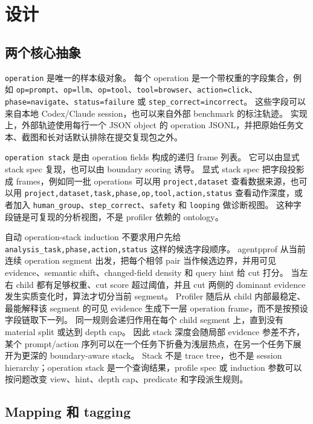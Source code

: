 \documentclass[10pt,twocolumn]{ctexart}
\newcommand{\toolname}{agentpprof}
\newcommand{\op}{\texttt{operation}}
\newcommand{\opstack}{\texttt{operation stack}}
\begin{document}
\section{设计}

\subsection{两个核心抽象}

\op{} 是唯一的样本级对象。
每个 operation 是一个带权重的字段集合，例如 \texttt{op=prompt}、\texttt{op=llm}、\texttt{op=tool}、\texttt{tool=browser}、\texttt{action=click}、\texttt{phase=navigate}、\texttt{status=failure} 或 \texttt{step\_correct=incorrect}。
这些字段可以来自本地 Codex/Claude session，也可以来自外部 benchmark 的标注轨迹。
实现上，外部轨迹使用每行一个 JSON object 的 operation JSONL，并把原始任务文本、截图和长对话默认排除在提交复现包之外。

\opstack{} 是由 operation fields 构成的递归 frame 列表。
它可以由显式 stack spec 复现，也可以由 boundary scoring 诱导。
显式 stack spec 把字段投影成 frames，例如同一批 operations 可以用 \texttt{project,dataset} 查看数据来源，也可以用 \texttt{project,dataset,task,phase,op,tool,action,status} 查看动作深度，或者加入 \texttt{human\_group}、\texttt{step\_correct}、\texttt{safety} 和 \texttt{looping} 做诊断视图。
这种字段链是可复现的分析视图，不是 profiler 依赖的 ontology。

自动 operation-stack induction 不要求用户先给 \texttt{analysis\_task,phase,action,status} 这样的候选字段顺序。
\toolname{} 从当前连续 operation segment 出发，把每个相邻 pair 当作候选边界，并用可见 evidence、semantic shift、changed-field density 和 query hint 给 cut 打分。
当左右 child 都有足够权重、cut score 超过阈值，并且 cut 两侧的 dominant evidence 发生实质变化时，算法才切分当前 segment。
Profiler 随后从 child 内部最稳定、最能解释该 segment 的可见 evidence 生成下一层 operation frame，而不是按预设字段链取下一列。
同一规则会递归作用在每个 child segment 上，直到没有 material split 或达到 depth cap。
因此 stack 深度会随局部 evidence 参差不齐，某个 prompt/action 序列可以在一个任务下折叠为浅层热点，在另一个任务下展开为更深的 boundary-aware stack。
Stack 不是 trace tree，也不是 session hierarchy；operation stack 是一个查询结果，profile spec 或 induction 参数可以按问题改变 view、hint、depth cap、predicate 和字段派生规则。

\subsection{Mapping 和 tagging}
\end{document}
